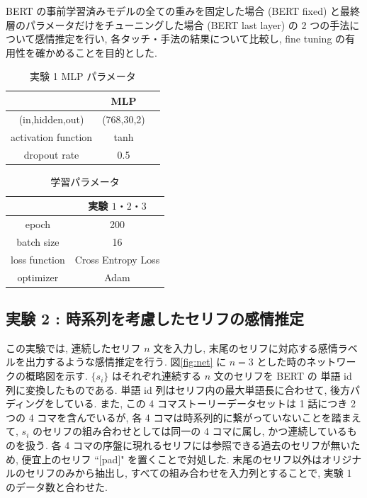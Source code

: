 \documentclass[twocolumn]{jarticle}     %
\begin{document}
BERT の事前学習済みモデルの全ての重みを固定した場合 (BERT fixed) と最終層のパラメータだけをチューニングした場合 (BERT last layer) の 2 つの手法について感情推定を行い, 各タッチ・手法の結果について比較し, fine tuning の有用性を確かめることを目的とした.


\begin{table}[htb]
\caption{実験 1 MLP パラメータ}
\label{table:mlp_para}
\centering
\begin{tabular}{|c||c|c|}
\hline
& MLP \\ \hline
(in,hidden,out) & (768,30,2) \\ \hline
activation function & tanh \\ \hline
dropout rate & 0.5 \\ \hline
\end{tabular}
\end{table}

\begin{table}[htb]
\caption{学習パラメータ}
\label{table:ex_para}
\centering
\begin{tabular}{|c||c|c|}
\hline
& \multicolumn{2}{|c|}{実験 $1・2・3$} \\ \hline
epoch & \multicolumn{2}{|c|}{200}  \\ \hline
batch size & \multicolumn{2}{|c|}{16} \\ \hline
loss function & \multicolumn{2}{|c|}{Cross Entropy Loss} \\ \hline
optimizer & \multicolumn{2}{|c|}{Adam} \\ \hline
\end{tabular}
\end{table}

\newpage

\subsection{\small{実験 2 : 時系列を考慮したセリフの感情推定}}
この実験では, 連続したセリフ $n$ 文を入力し, 末尾のセリフに対応する感情ラベルを出力するような感情推定を行う.
図\ref{fig:net} に $n = 3$ とした時のネットワークの概略図を示す. $\{s_i\}$ はそれぞれ連続する $n$ 文のセリフを BERT の 単語 id 列に変換したものである. 単語 id 列はセリフ内の最大単語長に合わせて, 後方パディングをしている. また, この 4 コマストーリーデータセットは 1 話につき 2 つの 4 コマを含んでいるが, 各 4 コマは時系列的に繋がっていないことを踏まえて, ${s_i}$ のセリフの組み合わせとしては同一の 4 コマに属し, かつ連続しているものを扱う. 各 4 コマの序盤に現れるセリフには参照できる過去のセリフが無いため, 便宜上のセリフ ``$[$pad$]$" を置くことで対処した. 末尾のセリフ以外はオリジナルのセリフのみから抽出し, すべての組み合わせを入力列とすることで, 実験 1 のデータ数と合わせた.
\end{document}
